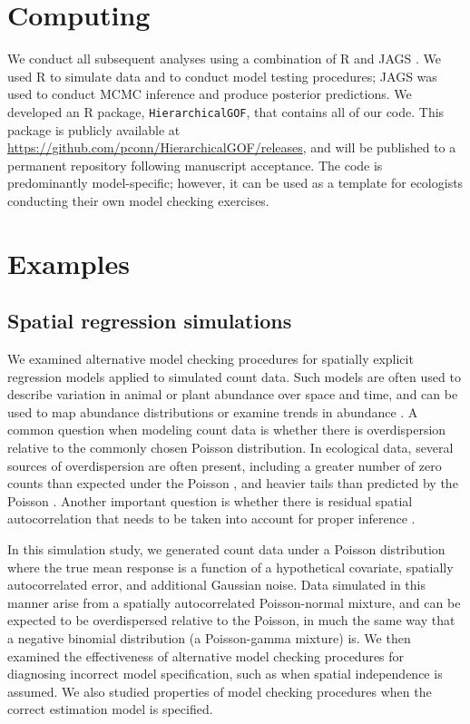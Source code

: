 \documentclass[12pt,english]{article}
\begin{document}
\begin{spacing}{1.9}
\section{Computing}

We conduct all subsequent analyses using a combination of R
\citep{RTeam2017} and JAGS \citep{Plummer2003}.  We used R to simulate
data and to conduct model testing procedures; JAGS was used to conduct
MCMC inference and produce posterior predictions. We developed an R
package, \texttt{HierarchicalGOF}, that contains all of our code.
This package is publicly available at
\url{https://github.com/pconn/HierarchicalGOF/releases}, and will be
published to a permanent repository following manuscript
acceptance. The code is predominantly model-specific; however,
it can be used as a template for ecologists conducting their own model
checking exercises.


\section{Examples}

\subsection{Spatial regression simulations}

We examined alternative model checking procedures for spatially
explicit regression models applied to simulated count data.  Such
models are often used to describe variation in animal or plant
abundance over space and time, and can be used to map abundance
distributions or examine trends in abundance
\citep[e.g.,][]{SauerLink2011,ConnEtAl2014}.  A common question when
modeling count data is whether there is overdispersion relative to the
commonly chosen Poisson distribution.  In ecological data, several
sources of overdispersion are often present, including a greater
number of zero counts than expected under the Poisson \citep[zero
inflation;][]{AgarwalEtAl2002}, and heavier tails than predicted by
the Poisson \citep{PottsElith2006,VerHoefBoveng2007}.  Another
important question is whether there is residual spatial
autocorrelation that needs to be taken into account for proper
inference \citep{Legendre1993,LichsteinEtAl2002}.

In this simulation study, we generated count data under a Poisson
distribution where the true mean response is a function of a
hypothetical covariate, spatially autocorrelated error, and additional
Gaussian noise.  Data simulated in this manner arise from a spatially autocorrelated Poisson-normal mixture, and
can be expected to be overdispersed relative to the Poisson, in much
the same way that a negative binomial distribution (a Poisson-gamma
mixture) is.  We then examined the effectiveness of alternative model
checking procedures for diagnosing incorrect model specification, such
as when spatial independence is assumed.  We also studied properties of
model checking procedures when the correct estimation model is
specified.


\end{spacing}
\end{document}
